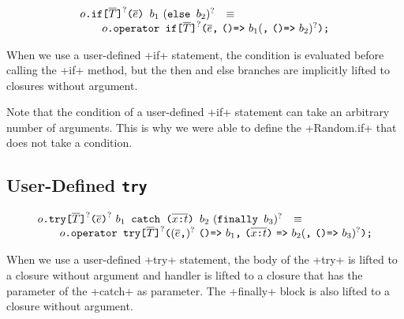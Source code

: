 $$
\begin{array}{rcl}
  \usrIf{o}{\overline{T}}{\overline{e}}{b_1}{b_2}
  & \equiv &
  \\
  \multicolumn{3}{r}{
  \qquad  \libIf{o}{\overline{T}}{\overline{e}}{b_1}{b_2}
  }
\end{array}
$$

  When we use a user-defined \xcd+if+ statement, the condition is
evaluated before calling the \xcd+if+ method, but the then and else
branches are implicitly lifted to closures without argument.

Note that the condition of a user-defined \xcd+if+ statement can take
an arbitrary number of arguments. This is why we were able to define the
\xcd+Random.if+ that does not take a condition.


\subsection{User-Defined \texttt{try}}

$$
\begin{array}{rcl}
  \usrTry{o}{\overline{T}}{\overline{e}}{b_1}{\overline{\vardecl{x}{t}}}{b_2}{b_3}
  & \equiv &
  \\
\multicolumn{3}{r}{
 \qquad \libTry{o}{\overline{T}}{\overline{e}}{b_1}{\overline{\vardecl{x}{t}}}{b_2}{b_3}
}
\end{array}
$$

When we use a user-defined \xcd+try+ statement, the body of the
\xcd+try+ is lifted to a closure without argument and handler is
lifted to a closure that has the parameter of the \xcd+catch+ as
parameter. The \xcd+finally+ block is also lifted to a closure
without argument.



